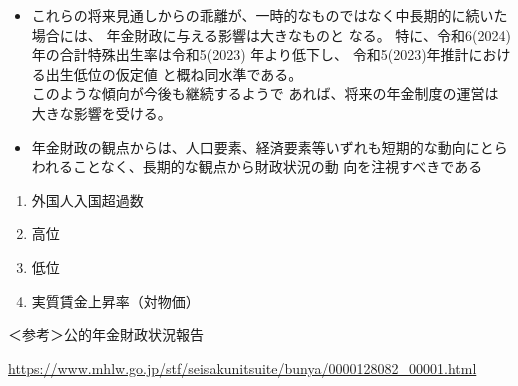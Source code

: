 \begin{fillblank}[自作 2026/11/7]
\begin{itemize}
\begin{enumerate}[(1)]
    \item 令和6(2024)年度は、マクロ経済スライドによる給付水準調整が行われた一方で、
    賃金の上昇が物価上昇に追いつかず、 実質賃金の伸びはマイナスとなったことから、
    令和5(2023) 年度とは異なり、既裁定年金の伸びを賃金の伸びより抑制する効果は発動されなかった。
  \end{enumerate}

  \item これらの将来見通しからの乖離が、一時的なものではなく中長期的に続いた場合には、
  年金財政に与える影響は大きなものと なる。
  特に、令和6(2024)年の合計特殊出生率は令和5(2023) 年より低下し、
  令和5(2023)年推計における出生低位の仮定値 と概ね同水準である。
  \\ このような傾向が今後も継続するようで あれば、将来の年金制度の運営は大きな影響を受ける。

  \item 年金財政の観点からは、人口要素、経済要素等いずれも短期的な動向にとらわれることなく、長期的な観点から財政状況の動 向を注視すべきである
\end{itemize}


\end{fillblank}

\begin{answerbox}
  \begin{enumerate}[A: ]
    \item 外国人入国超過数
    \item 高位
    \item 低位
    \item 実質賃金上昇率（対物価）
  \end{enumerate}
\end{answerbox}

\begin{explanationbox}
  ＜参考＞公的年金財政状況報告

  \url{https://www.mhlw.go.jp/stf/seisakunitsuite/bunya/0000128082_00001.html}
\end{explanationbox}

\newpage
